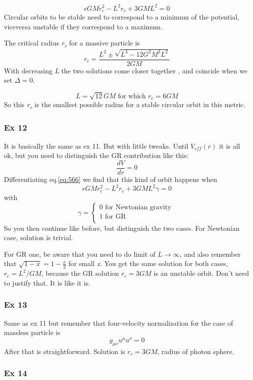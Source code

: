 \[
\epsilon GM r_{c}^{2}- L^{2}r_{c} + 3GML^{2} = 0
\]
Circular orbits to be stable need to correspond to a minimum of the potential, viceversa unstable if they correspond to a maximum.\par
The critical radius \emph{r\textsubscript{c}} for a massive particle is
\begin{equation}
	r_{c} = \frac{L^{2} \pm \sqrt{ L^{4} - 12G^{2} M^{2}L^{2}}}{2GM}
\end{equation}
With decreasing \emph{ L} the two solutions come closer together , and coincide when we set $\Delta =0$.\par
\[
	L = \sqrt{12}GM \text{ for which } r_{c} = 6GM
\]
So this \emph{r\textsubscript{c}} is the smallest possible radius for a stable circular orbit in this metric.

\subsubsection{Ex 12}
It is basically the same as ex 11. But with little tweaks. Until $V_{eff}\left( r \right)$ it is all ok, but you need to distinguish the GR contribution like this:
\[
\frac{d V}{d r} = 0
\]
Differentiating eq.\ref{eq:566} we find that this kind of orbit happens when
\[
\epsilon GM r_{c}^{2}- L^{2}r_{c} + 3GML^{2}\gamma  = 0
\]
with
\[
\gamma = \begin{cases}
0 \text{ for Newtonian gravity } \\
1 \text{ for GR } \\
\end{cases}
\]
So you then continue like before, but distinguish the two cases. For Newtonian case, solution is trivial.\par
 For GR one, be aware that you need to do limit of $L\to \infty$, and also remember that $\sqrt{1-x} = 1 - \frac{x}{2}$ for small \emph{x}. You get the same solution for both cases, $r_{c} = L^{2}/GM$, because the GR solution $r_{c} = 3GM$ is an unstable orbit. Don't need to justify that. It is like it is.

\subsubsection{Ex 13}
Same as ex 11 but remember that four-velocity normalization for the case of massless particle is
\[
g_{\mu \nu }u^{\mu }u^{\nu } = 0
\]
After that is straightforward. Solution is $r_{c} = 3GM$, radius of photon sphere.

\subsubsection{Ex 14}

